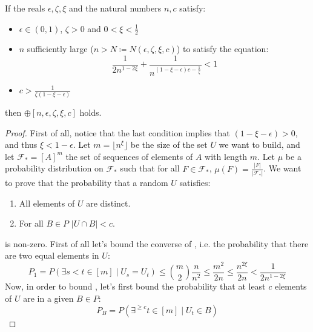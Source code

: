     \begin{lemma}[Lemma 4.19] \label{lem:n_large_enough_valid_values}
        If the reals $\epsilon, \zeta, \xi$ and the natural numbers $n, c$ satisfy:
        \begin{itemize}
            \item $\epsilon \in (0,1)$, $\zeta > 0$ and $0 < \xi < \frac{1}{2}$
            \item $n$ sufficiently large ($n > N \coloneqq N(\epsilon, \zeta, \xi, c)$) to satisfy the equation:
            \[
                \frac{1}{2n^{1-2\xi}} + \frac{1}{n^{(1 - \xi - \epsilon)c - \frac{1}{\zeta}}} < 1
            \]
            \item $c > \frac{1}{\zeta (1 - \xi - \epsilon)}$
        \end{itemize}
        then $\oplus[n, \epsilon, \zeta, \xi, c]$ holds.
        \begin{proof}
            First of all, notice that the last condition implies that $(1 - \xi - \epsilon) > 0$, and thus $\xi < 1 -\epsilon$.
            Let $m = \lfloor n^\xi \rfloor$ be the size of the set $U$ we want to build, and let $\mathcal{F}_* = [A]^m$
            the set of sequences of elements of $A$ with length $m$.
            Let $\mu$ be a probability distribution on $\mathcal{F}_*$ such that for all $F \in \mathcal{F}_*$,
            $\mu(F) = \frac{|F|}{|\mathcal{F}_*|}$.
            We want to prove that the probability that a random $U$ satisfies:
            \begin{enumerate}
                \item\label{itm:n_large_enough_valid_values.1} All elements of $U$ are distinct.
                \item\label{itm:n_large_enough_valid_values.2} For all $B \in P$ $|U \cap B| < c$.
            \end{enumerate}
            is non-zero.
            First of all let's bound the converse of , i.e. the probability that there are two equal elements
            in $U$:
            \[
                P_1 = P(\exists s < t \in [m] \mid U_s = U_t)
                    \leq {m \choose 2} \frac{n}{n^2}
                    \leq \frac{m^2}{2n}
                    \leq \frac{n^{2\xi}}{2n}
                    < \frac{1}{2n^{1-2\xi}}
            \]
            Now, in order to bound , let's first bound the probability that at least $c$ elements of
            $U$ are in a given $B \in P$:
            \[
                P_B = P(\exists^{\geq c} t\in [m] \mid U_t \in B)
\]
\end{proof}
\end{lemma}
